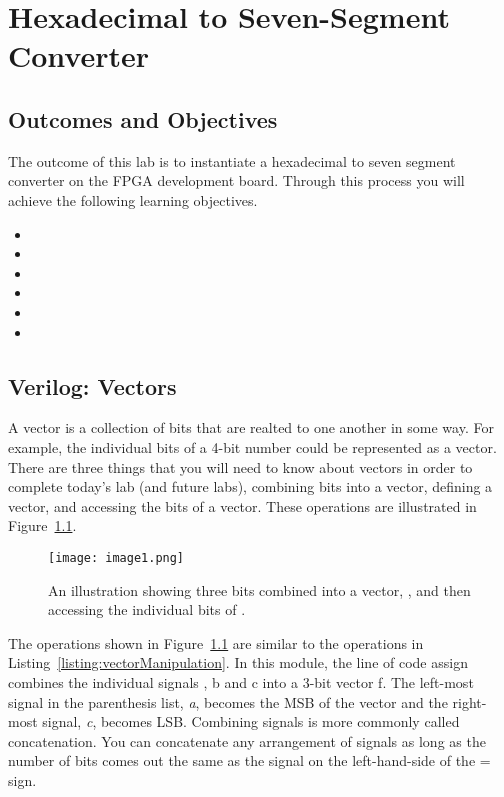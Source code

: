 \chapter{Hexadecimal to Seven-Segment Converter}
\label{chapter:HexToSeven}
\graphicspath{ {./Lab02HexToSeven/Fig} }

\section{Outcomes and Objectives}

The outcome of this lab is to instantiate a hexadecimal to seven segment converter
on the FPGA development board.  Through this process you will achieve the following
learning objectives.
\begin{itemize}
        \itemsep=0em
    \item {}
    \item {}
    \item {}
    \item {}
    \item {}
    \item {}
\end{itemize}

\section{Verilog: Vectors}

A vector is a collection of bits that are realted to one another in some way.  For example,
the individual bits of a 4-bit number could be represented as a vector.
There are three things that you will need to know about vectors in order to
complete today's lab (and future labs), combining bits into a vector,
defining a vector, and accessing the bits of a vector. These operations
are illustrated in Figure~\ref{fig:combinVector}.

\begin{figure}[ht]
    \texttt{[image: image1.png]}
    \caption{An illustration showing three bits combined into a vector, ,  and then accessing the
    individual bits of .}
    \label{fig:combinVector}
\end{figure}

The operations shown in Figure~\ref{fig:combinVector} are similar to
the operations in Listing~\ref{listing:vectorManipulation}.
In this module, the line of code assign  combines the
individual signals , b and c into a 3-bit vector f. The left-most signal
in the parenthesis list, \emph{a}, becomes the MSB of the vector and the
right-most signal, \emph{c}, becomes LSB.
Combining signals is more commonly called concatenation. You can
concatenate any arrangement of signals as long as the number of bits
comes out the same as the signal on the left-hand-side of the = sign.

